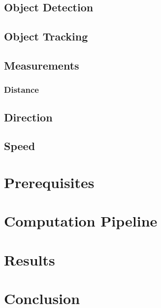 \documentclass[]{IEEEphot}
\begin{document}
	\subsection{Object Detection}
	\subsection{Object Tracking}
	\subsection{Measurements}
	\subsubsection{Distance}
	\subsection{Direction}
	\subsection{Speed}
	\section{Prerequisites}
	\section{Computation Pipeline}
	\section{Results}
	\section{Conclusion}

	\newpage

	\printbibliography[title={Literaturverzeichnis}]
\end{document}
